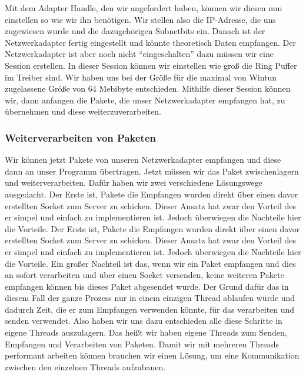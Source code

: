 Mit dem Adapter Handle, den wir angefordert haben, können wir diesen nun einstellen so wie wir ihn benötigen. Wir stellen also die IP-Adresse, die uns zugewiesen wurde und die dazugehörigen Subnetbits ein. Danach ist der Netzwerkadapter fertig eingestellt und könnte theoretisch Daten empfangen.
\newline
\newline
Der Netzwerkadapter ist aber noch nicht “eingeschalten” dazu müssen wir eine Session erstellen. In dieser Session können wir einstellen wie groß die Ring Puffer im Treiber sind. Wir haben uns bei der Größe für die maximal von Wintun zugelassene Größe von 64 Mebibyte entschieden. Mithilfe dieser Session können wir, dann anfangen die Pakete, die unser Netzwerkadapter empfangen hat, zu übernehmen und diese weiterzuverarbeiten.
\subsubsection{Weiterverarbeiten von Paketen}
Wir können jetzt Pakete von unseren Netzwerkadapter empfangen und diese dann an unser Programm übertragen. Jetzt müssen wir das Paket zwischenlagern und weiterverarbeiten. Dafür haben wir zwei verschiedene Lösungswege ausgedacht. 
\newline
\newline
Der Erste ist, Pakete die Empfangen wurden direkt über einen davor erstellten Socket zum Server zu schicken.  Dieser Ansatz hat zwar den Vorteil des er simpel und einfach zu implementieren ist. Jedoch überwiegen die Nachteile hier die Vorteile. 
\newline
\newline
Der Erste ist, Pakete die Empfangen wurden direkt über einen davor erstellten Socket zum Server zu schicken.  Dieser Ansatz hat zwar den Vorteil des er simpel und einfach zu implementieren ist. Jedoch überwiegen die Nachteile hier die Vorteile.
\newline
\newline
Ein großer Nachteil ist das, wenn wir ein Paket empfangen und dies an sofort verarbeiten und über einen Socket versenden, keine weiteren Pakete empfangen können bis dieses Paket abgesendet wurde. Der Grund dafür das in diesem Fall der ganze Prozess nur in einem einzigen Thread ablaufen würde und dadurch Zeit, die er zum Empfangen verwenden könnte, für das verarbeiten und senden verwendet.
\newline
\newline
Also haben wir uns dazu entschieden alle diese Schritte in eigene Threads auszulagern. Das heißt wir haben eigene Threads zum Senden, Empfangen und Verarbeiten von Paketen. Damit wir mit mehreren Threads performant arbeiten können brauchen wir einen Lösung, um eine Kommunikation zwischen den einzelnen Threads aufzubauen.

